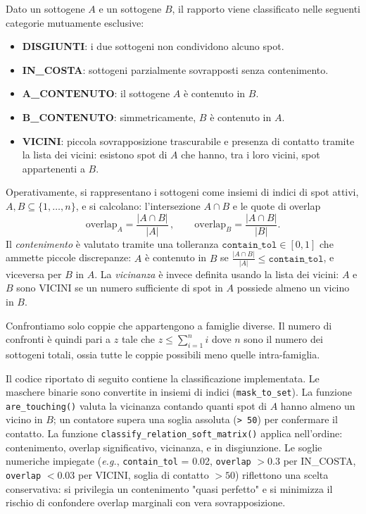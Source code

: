 Dato un sottogene $A$ e un sottogene $B$, il rapporto viene classificato
nelle seguenti categorie mutuamente esclusive:
\begin{itemize}
  \item \textbf{DISGIUNTI}: i due sottogeni non condividono alcuno spot.
  \item \textbf{IN\_COSTA}: sottogeni parzialmente sovrapposti senza contenimento.
  \item \textbf{A\_CONTENUTO}: il sottogene $A$ è contenuto in $B$.
  \item \textbf{B\_CONTENUTO}: simmetricamente, $B$ è contenuto in $A$.
  \item \textbf{VICINI}: piccola sovrapposizione trascurabile e presenza di contatto tramite la lista dei vicini:
  esistono spot di $A$ che hanno, tra i loro vicini, spot appartenenti a $B$.
\end{itemize}

Operativamente, si rappresentano i sottogeni come insiemi di indici di spot attivi, $A,B\subseteq\{1,\dots,n\}$,
e si calcolano: l’intersezione $A\cap B$ e le quote di overlap
\[
\text{overlap}_A=\frac{|A\cap B|}{|A|}\,,\qquad
\text{overlap}_B=\frac{|A\cap B|}{|B|}.
\]
Il \emph{contenimento} è valutato tramite una tolleranza $\texttt{contain\_tol}\in[0,1]$ che ammette piccole discrepanze:
$A$ è contenuto in $B$ se $\frac{|A\cap B|}{|A|}\le\texttt{contain\_tol}$, e viceversa per $B$ in $A$.
La \emph{vicinanza} è invece definita usando la lista dei vicini: $A$ e $B$ sono VICINI se
un numero sufficiente di spot in $A$ possiede almeno un vicino in $B$.

Confrontiamo solo coppie che appartengono a famiglie diverse. 
Il numero di confronti è quindi pari a $z$ tale che $z \le \sum_{i=1}^n{i}$ dove 
$n$ sono il numero dei sottogeni totali, ossia tutte le coppie possibili meno quelle intra-famiglia.


Il codice riportato di seguito contiene la classificazione implementata. 
Le maschere binarie sono convertite in insiemi di indici (\texttt{mask\_to\_set}). 
La funzione \texttt{are\_touching()} valuta la vicinanza  
contando quanti spot di $A$ hanno almeno un vicino in $B$; 
un contatore supera una soglia assoluta (\texttt{> 50}) per confermare il contatto.
La funzione \texttt{classify\_relation\_soft\_matrix()} applica nell'ordine: 
contenimento, overlap significativo, vicinanza, e in disgiunzione.
Le soglie numeriche impiegate (\emph{e.g.}, \texttt{contain\_tol} = 0.02, \texttt{overlap} $ > 0.3$ per IN\_COSTA,
\texttt{overlap} $ < 0.03$ per VICINI, soglia di contatto $ > 50$) riflettono una scelta conservativa: si privilegia
un contenimento "quasi perfetto" e si minimizza il rischio di confondere overlap marginali con vera sovrapposizione.

